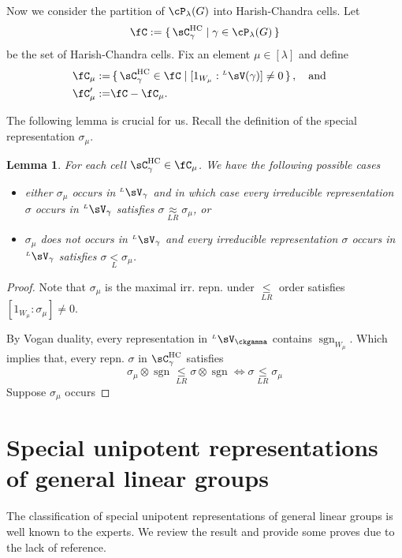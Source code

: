 \documentclass[12pt,a4paper]{amsart}
\newcommand{\sgn}{\operatorname{sgn}}
\numberwithin{equation}{section}
\newtheorem{lem}[thm]{Lemma}
\theoremstyle{remark}
\def\LV{{}^{\scriptscriptstyle L}\sV}
\def\LV{{}^{\scriptscriptstyle L}\sV}
\def\AND{\quad \text{and} \quad}
\def\lneqL{\mathrel{\mathop{<}\limits_{\scriptscriptstyle L}}}
\def\leqLR{\mathrel{\mathop{\leq}\limits_{\scriptscriptstyle LR}}}
\def\approxLR{\mathrel{\mathop{\approx}\limits_{\scriptscriptstyle LR}}}
\begin{document}
Now we consider the partition of $\cP_{\lambda}(G)$ into Harish-Chandra cells.
Let
\[
\fC:= \set{\CHC_{\gamma}|\gamma\in \cP_{\lambda}(G)}
\]
be the set of Harish-Chandra cells.
Fix an element $\mu\in [\lambda]$ and define
\[
\begin{split}
  \fC_{\mu}  := &\set{\CHC_{\gamma} \in \fC| [1_{W_{\mu}}:\LV(\gamma)]\neq 0}, \AND\\
  \fC'_{\mu} :=& \fC - \fC_{\mu}.
\end{split}
\]

The following lemma is crucial for us.
Recall the definition of  the special representation $\sigma_{\mu}$.
\begin{lem}
For each cell $\CHC_{\gamma}\in \fC_{\mu}$.
We have the following possible cases
\begin{itemize}
  \item either
        $\sigma_{\mu}$ occurs in $\LV_{\gamma}$ and in which case every irreducible representation $\sigma$ occurs in  $\LV_{\gamma}$
        satisfies $\sigma\approxLR \sigma_{\mu}$, or
  \item $\sigma_{\mu}$ does not occurs in $\LV_{\gamma}$ and every irreducible representation $\sigma$ occurs in  $\LV_{\gamma}$
        satisfies $\sigma\lneqL \sigma_{\mu}$.
\end{itemize}
\end{lem}
\begin{proof}
  Note that $\sigma_{\mu}$ is the maximal irr. repn. under $\leqLR$ order
  satisfies $[1_{W_{\mu}}: \sigma_{\mu}]\neq 0$.

  By Vogan duality, every representation in $\LV_{\ckgamma}$ contains
  $\sgn_{W_{\mu}}$.
  Which implies that, every repn. $\sigma$ in $\CHC_{\gamma}$  satisfies
  \[
   \sigma_{\mu}\otimes \sgn\leqLR \sigma\otimes \sgn
   \Leftrightarrow \sigma \leqLR \sigma_{\mu}
  \]
  Suppose $\sigma_{\mu}$ occurs

\end{proof}


%



\section{Special unipotent representations of general linear groups}

The classification of special unipotent representations of general linear groups is well
known to the experts.
We review the result and provide some proves due to the
lack of reference.
\end{document}
